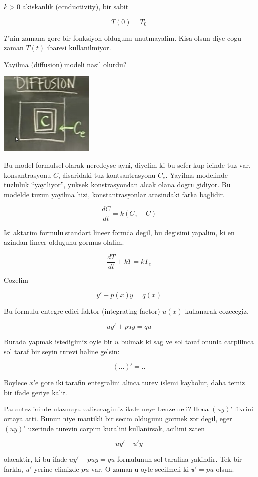 \documentclass[12pt,fleqn]{article}\usepackage{../common}
\begin{document}
$k > 0$ akiskanlik (conductivity), bir sabit.

\[ T(0) = T_0 \]

$T$'nin zamana gore bir fonksiyon oldugunu unutmayalim. Kisa olsun diye
cogu zaman $T(t)$ ibaresi kullanilmiyor. 

Yayilma (diffusion) modeli nasil olurdu? 

\includegraphics[height=4cm]{3_2.png}

Bu model formulsel olarak neredeyse ayni, diyelim ki bu sefer kup
icinde tuz var, konsantrasyonu $C$, disaridaki tuz kontsantrasyonu
$C_e$. Yayilma modelinde tuzluluk ``yayiliyor'', yuksek konstrasyondan
alcak olana dogru gidiyor. Bu modelde tuzun yayilma hizi,
konstantrasyonlar arasindaki farka baglidir. 

\[ \frac{dC}{dt} = k(C_e - C) \]

Isi aktarim formulu standart lineer formda degil, bu degisimi
yapalim, ki en azindan lineer oldugunu gormus olalim. 

\[ \frac{dT}{dt} + kT = kT_e \]

Cozelim

\[ y' + p(x)y = q(x) \]

Bu formulu entegre edici faktor (integrating factor) $u(x)$ kullanarak
cozecegiz.

\[ uy' + puy = qu \]

Burada yapmak istedigimiz oyle bir $u$ bulmak ki sag ve sol taraf
onunla carpilinca sol taraf bir seyin turevi haline gelsin:

\[ ( ... )' = ..  \]

Boylece $x$'e gore iki tarafin entegralini alinca turev islemi
kaybolur, daha temiz bir ifade geriye kalir. 

Parantez icinde ulasmaya calisacagimiz ifade neye benzemeli? Hoca
$(uy)'$ fikrini ortaya atti. Bunun niye mantikli bir secim oldugunu
gormek zor degil, eger $(uy)'$ uzerinde turevin carpim kuralini
kullanirsak, acilimi zaten 

\[ uy' + u'y \]

olacaktir, ki bu ifade $uy' + puy = qu$ formulunun sol tarafina
yakindir. Tek bir farkla, $u'$ yerine elimizde $pu$ var. O zaman u
oyle secilmeli ki $u' = pu$ olsun. 
\end{document}
